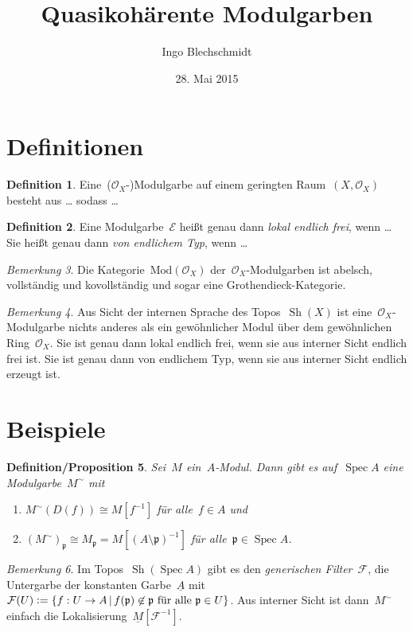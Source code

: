 \documentclass[a4paper,ngerman,12pt]{scrartcl}
\theoremstyle{definition}
\newtheorem{defn}{Definition}[section]
\theoremstyle{plain}
\newtheorem{defnprop}[defn]{Definition/Proposition}
\theoremstyle{remark}
\newtheorem{rem}[defn]{Bemerkung}
\newcommand{\E}{\mathcal{E}}
\newcommand{\F}{\mathcal{F}}
\renewcommand{\O}{\mathcal{O}}
\newcommand{\ppp}{\mathfrak{p}}
\newcommand{\ul}[1]{\underline{#1}}
\newcommand{\Sh}{\operatorname{Sh}}
\DeclareMathOperator{\Spec}{Spec}
\newcommand{\defeq}{\vcentcolon=}
\begin{document}
\title{Quasikohärente Modulgarben}
\author{Ingo Blechschmidt}
\date{28. Mai 2015}
\maketitle

\section{Definitionen}

\begin{defn}Eine~($\O_X$-)Modulgarbe auf einem geringten Raum~$(X,\O_X)$ besteht
aus \ldots{} sodass \ldots\end{defn}

\begin{defn}Eine Modulgarbe~$\E$ heißt genau dann \emph{lokal endlich frei},
wenn \ldots{} Sie heißt genau dann \emph{von endlichem Typ}, wenn
\ldots\end{defn}

\begin{rem}Die Kategorie~$\mathrm{Mod}(\O_X)$ der~$\O_X$-Modulgarben ist
abelsch, vollständig und kovollständig und sogar eine
Grothendieck-Kategorie.\end{rem}

\begin{rem}Aus Sicht der internen Sprache des Topos~$\Sh(X)$ ist
eine~$\O_X$-Modulgarbe nichts anderes als ein gewöhnlicher Modul über dem
gewöhnlichen Ring~$\O_X$. Sie ist genau dann lokal endlich frei, wenn sie aus
interner Sicht endlich frei ist. Sie ist genau dann von endlichem Typ, wenn sie
aus interner Sicht endlich erzeugt ist.\end{rem}


\section{Beispiele}

\begin{defnprop}Sei~$M$ ein~$A$-Modul. Dann gibt es auf~$\Spec A$ eine
Modulgarbe~$M^\sim$ mit
\begin{enumerate}
\item $M^\sim(D(f)) \cong M[f^{-1}]$ für alle~$f \in A$ und
\item $(M^\sim)_\ppp \cong M_\ppp = M[(A\setminus\ppp)^{-1}]$ für alle~$\ppp
\in \Spec A$.
\end{enumerate}
\end{defnprop}

\begin{rem}Im Topos~$\Sh(\Spec A)$ gibt es den \emph{generischen Filter}~$\F$,
die Untergarbe der konstanten Garbe~$\ul{A}$ mit~$\F(U) \defeq \{ f : U \to A
\,|\, \text{$f(\ppp) \not\in \ppp$ für alle~$\ppp \in U$} \}$. Aus interner
Sicht ist dann~$M^\sim$ einfach die Lokalisierung~$\ul{M}[\F^{-1}]$.\end{rem}
\end{document}
